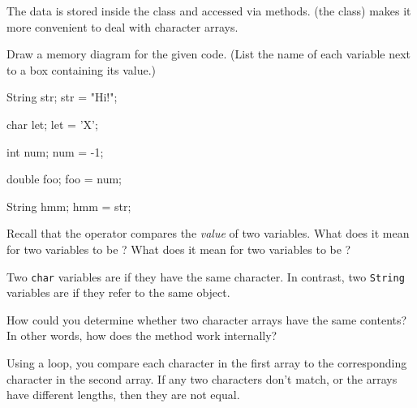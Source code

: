 \begin{answer}
The data is stored inside the class and accessed via methods.
 (the class) makes it more convenient to deal with character arrays.
\end{answer}





\Q \label{diagram}
Draw a memory diagram for the given code.
(List the name of each variable next to a box containing its value.)

\hspace*{1em}
\begin{minipage}{0.25\linewidth}

\begin{javalst}
String str;
str = "Hi!";

char let;
let = 'X';

int num;
num = -1;

double foo;
foo = num;

String hmm;
hmm = str;
\end{javalst}

\end{minipage}
\begin{minipage}{0.65\linewidth}


\end{minipage}
\vspace{1ex}


\Q Recall that the \java{==} operator compares the {\it value} of two variables.
What does it mean for two  variables to be \java{==}?
What does it mean for two  variables to be \java{==}?

\begin{answer}
Two {\tt char} variables are \java{==} if they have the same character.
In contrast, two {\tt String} variables are \java{==} if they refer to the same  object.
\end{answer}


\Q How could you determine whether two character arrays have the same contents?
In other words, how does the  method work internally?

\begin{answer}
Using a loop, you compare each character in the first array to the corresponding character in the second array. If any two characters don't match, or the arrays have different lengths, then they are not equal.
\end{answer}
